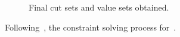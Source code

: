 \begin{figure}[t]
\begin{subfigure}[t]{0.24\linewidth}
\begin{tabular}{p{0.95\linewidth}}
      \end{tabular}
      \caption{Final cut sets and value sets obtained.}
  \end{subfigure}

  \caption{Following~, the constraint solving process for~.}
  \label{fig:constraint-solving}
\end{figure}
